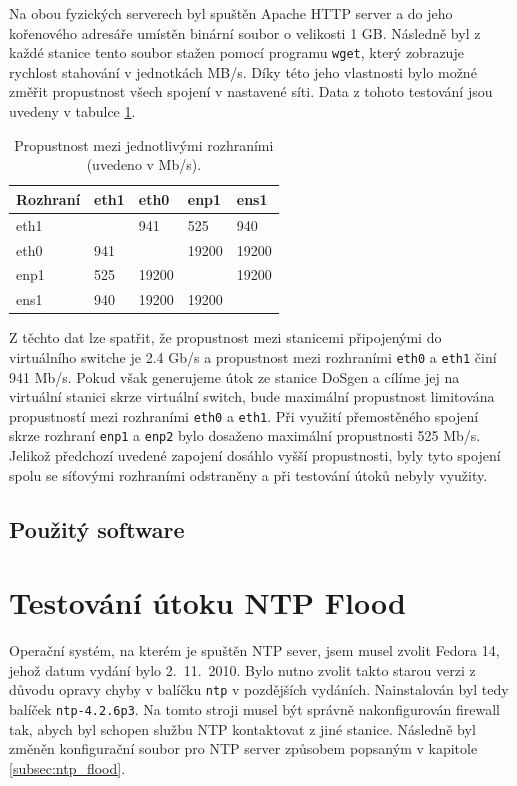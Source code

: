 Na obou fyzických serverech byl spuštěn Apache HTTP server a do jeho kořenového adresáře umístěn binární soubor o velikosti 1 GB. Následně byl z každé stanice tento soubor stažen pomocí programu \texttt{wget}, který zobrazuje rychlost stahování v jednotkách MB/s. Díky této jeho vlastnosti bylo možné změřit propustnost všech spojení v nastavené síti. Data z tohoto testování jsou uvedeny v tabulce \ref{tab:troughput-lab-interfaces}.

\begin{table}[ht]
	\centering
	\caption{Propustnost mezi jednotlivými rozhraními (uvedeno v Mb/s).}
	\label{tab:troughput-lab-interfaces}
	\begin{tabular}{|l|l|l|l|l|}
		\hline
		Rozhraní & eth1 & eth0  & enp1  & ens1  \\ \hline
		eth1     &      & 941   & 525   & 940   \\ \hline
		eth0     & 941  &       & 19200 & 19200 \\ \hline
		enp1     & 525  & 19200 &       & 19200 \\ \hline
		ens1     & 940  & 19200 & 19200 &       \\ \hline
	\end{tabular}
\end{table}

Z těchto dat lze spatřit, že propustnost mezi stanicemi připojenými do virtuálního switche je 2.4 Gb/s a propustnost mezi rozhraními \texttt{eth0} a \texttt{eth1} činí 941 Mb/s. Pokud však generujeme útok ze stanice DoSgen a cílíme jej na virtuální stanici skrze virtuální switch, bude maximální propustnost limitována propustností mezi rozhraními \texttt{eth0} a \texttt{eth1}.
Při využití přemostěného spojení skrze rozhraní \texttt{enp1} a \texttt{enp2} bylo dosaženo maximální propustnosti 525 Mb/s. Jelikož předchozí uvedené zapojení dosáhlo vyšší propustnosti, byly tyto spojení spolu se síťovými rozhraními odstraněny a při testování útoků nebyly využity.



\subsection{Použitý software} %

\newpage
\section{Testování útoku NTP Flood}
Operační systém, na kterém je spuštěn NTP sever, jsem musel zvolit Fedora 14, jehož datum vydání bylo 2.\ 11.\ 2010. Bylo nutno zvolit takto starou verzi z důvodu opravy chyby v balíčku \texttt{ntp} v pozdějších vydáních. Nainstalován byl tedy balíček \texttt{ntp-4.2.6p3}. Na tomto stroji musel být správně nakonfigurován firewall tak, abych byl schopen službu NTP kontaktovat z jiné stanice. Následně byl změněn konfigurační soubor pro NTP server způsobem popsaným v kapitole \ref{subsec:ntp_flood}.

